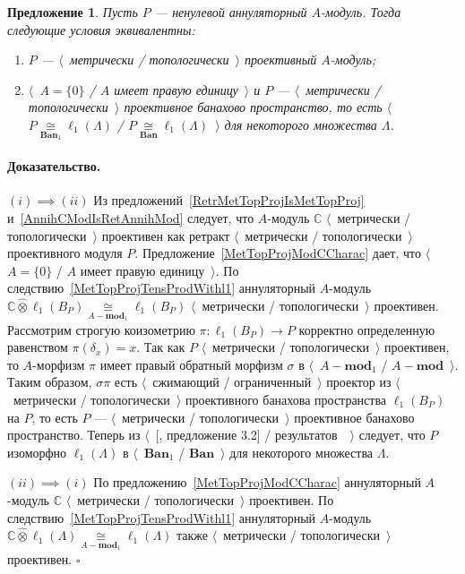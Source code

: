 \documentclass[12pt]{article}
\newcommand{\projtens}{\mathbin{\widehat{\otimes}}}
\newcommand{\isom}[1]{\mathop{\mathbin{\cong}}\limits_{#1}}
\newtheorem{proposition}[theorem]{Предложение}
\renewenvironment{proof}{\paragraph{Доказательство.}}{\hfill$\square$\medskip}
\begin{document}
\begin{proposition}\label{MetTopProjOfAnnihModCharac} Пусть $P$ --- ненулевой
    аннуляторный $A$-модуль. Тогда следующие условия эквивалентны:
    \begin{enumerate}[label = (\roman*)]
        \item $P$ --- $\langle$~метрически / топологически~$\rangle$ проективный
              $A$-модуль;

        \item $\langle$~$A= \{0 \}$ / $A$ имеет правую единицу~$\rangle$ и $P$ ---
              $\langle$~метрически / топологически~$\rangle$ проективное банахово
              пространство, то есть $\langle$~$P\isom{\mathbf{Ban}_1}\ell_1(\Lambda)$ /
              $P\isom{\mathbf{Ban}}\ell_1(\Lambda)$~$\rangle$ для некоторого множества
              $\Lambda$.
    \end{enumerate}

\end{proposition}
\begin{proof} $(i) \implies  (ii)$ Из
    предложений~\ref{RetrMetTopProjIsMetTopProj}
    и~\ref{AnnihCModIsRetAnnihMod} следует, что $A$-модуль $\mathbb{C}$
    $\langle$~метрически / топологически~$\rangle$ проективен как
    ретракт $\langle$~метрически / топологически~$\rangle$ проективного
    модуля $P$. Предложение~\ref{MetTopProjModCCharac} дает, что
    $\langle$~$A= \{0 \}$ / $A$ имеет правую единицу~$\rangle$.  По
    следствию~\ref{MetTopProjTensProdWithl1} аннуляторный $A$-модуль
    $\mathbb{C}\projtens\ell_1(B_P)\isom{A-\mathbf{mod}_1}\ell_1(B_P)$
    $\langle$~метрически / топологически~$\rangle$ проективен.
    Рассмотрим строгую коизометрию $\pi:\ell_1(B_P)\to P$ корректно
    определенную равенством $\pi(\delta_x)=x$. Так как $P$
    $\langle$~метрически / топологически~$\rangle$ проективен, то
    $A$-морфизм $\pi$ имеет правый обратный морфизм $\sigma$ в
    $\langle$~$A-\mathbf{mod}_1$ / $A-\mathbf{mod}$~$\rangle$. Таким
    образом, $\sigma\pi$ есть $\langle$~сжимающий /
    ограниченный~$\rangle$ проектор из $\langle$~метрически /
    топологически~$\rangle$ проективного банахова пространства
    $\ell_1(B_P)$ на $P$, то есть $P$ --- $\langle$~метрически /
    топологически~$\rangle$ проективное банахово пространство. Теперь из
    $\langle$~[\cite{HelMetrFrQMod}, предложение 3.2] /
    результатов~\cite{KotheTopProjBanSp}~$\rangle$ следует, что $P$
    изоморфно $\ell_1(\Lambda)$ в $\langle$~$\mathbf{Ban}_1$ /
    $\mathbf{Ban}$~$\rangle$ для некоторого множества $\Lambda$.

    $(ii)\implies (i)$ По предложению~\ref{MetTopProjModCCharac}
    аннуляторный $A$-модуль $\mathbb{C}$ $\langle$~метрически /
    топологически~$\rangle$ проективен. По
    следствию~\ref{MetTopProjTensProdWithl1} аннуляторный $A$-модуль
    $\mathbb{C}\projtens\ell_1(\Lambda)\isom{A-\mathbf{mod}_1}\ell_1(\Lambda)$
    также $\langle$~метрически / топологически~$\rangle$ проективен.
\end{proof}
\end{document}
